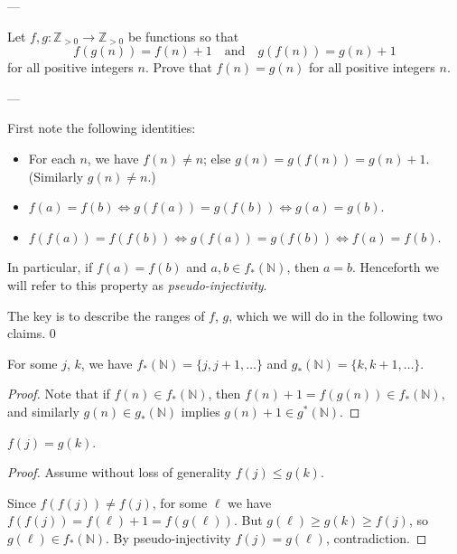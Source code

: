 
---

Let $f,g:\mathbb Z_{>0}\to\mathbb Z_{>0}$ be functions so that \[f(g(n))=f(n)+1\quad\text{and}\quad g(f(n))=g(n)+1\]
for all positive integers $n$. Prove that $f(n)=g(n)$ for all positive integers $n$.

---

First note the following identities:
\begin{itemize}[itemsep=0em]
    \item For each $n$, we have $f(n)\ne n$; else $g(n)=g(f(n))=g(n)+1$. (Similarly $g(n)\ne n$.)
    \item $f(a)=f(b)\iff g(f(a))=g(f(b))\iff g(a)=g(b)$.
    \item $f(f(a))=f(f(b))\iff g(f(a))=g(f(b))\iff f(a)=f(b)$.
\end{itemize}
In particular, if $f(a)=f(b)$ and $a,b\in f_*(\mathbb N)$, then $a=b$. Henceforth we will refer to this property as \emph{pseudo-injectivity}.

The key is to describe the ranges of $f$, $g$, which we will do in the following two claims.
\setcounter{iclaim}0
\begin{iclaim}
    For some $j$, $k$, we have $f_*(\mathbb N)=\{j,j+1,\ldots\}$ and $g_*(\mathbb N)=\{k,k+1,\ldots\}$.
\end{iclaim}
\begin{proof}
Note that if $f(n)\in f_*(\mathbb N)$, then $f(n)+1=f(g(n))\in f_*(\mathbb N)$, and similarly $g(n)\in g_*(\mathbb N)$ implies $g(n)+1\in g^*(\mathbb N)$.
\end{proof}
\begin{iclaim}
    $f(j)=g(k)$.
\end{iclaim}
\begin{proof}
    Assume without loss of generality $f(j)\le g(k)$.

    Since $f(f(j))\ne f(j)$, for some $\ell$ we have $f(f(j))=f(\ell)+1=f(g(\ell))$. But $g(\ell)\ge g(k)\ge f(j)$, so $g(\ell)\in f_*(\mathbb N)$. By pseudo-injectivity $f(j)=g(\ell)$, contradiction.
\end{proof}


